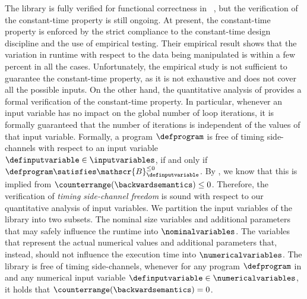 The library is fully verified for functional correctness in \hollight~, but the verification of the constant-time property is still ongoing.
At present, the constant-time property is enforced by the strict compliance to the constant-time design discipline and the use of empirical testing.
Their empirical
result
shows that the variation in runtime with respect to the data being manipulated is within a few percent in all the cases.
Unfortunately, the empirical study is not sufficient to guarantee the constant-time property, as it is not exhaustive and does not cover all the possible inputs.
On the other hand, the quantitative analysis of \timesec{} provides a formal verification of the constant-time property.
In particular, whenever an input variable has no impact on the global number of loop iterations, it is formally guaranteed that the number of iterations is independent of the values of that input variable.
Formally, a program $\defprogram$ is free of timing side-channels with respect to an input variable $\definputvariable\in\inputvariables$, if and only if $\defprogram \satisfies \mathscr{B}^{\le 0}_{\definputvariable}$.
By , we know that this is implied from $\counterrange(\backwardsemantics) \le 0$.
Therefore, the verification of \textit{timing side-channel freedom} is sound with respect to our quantitative analysis of input variables.
We partition the input variables of the \bignum{} library into two subsets.
The nominal size variables and additional parameters that may safely influence the runtime into $\nominalvariables$.
The variables that represent the actual numerical values and additional parameters that, instead, should not influence the execution time into $\numericalvariables$.
The \bignum{} library is free of timing side-channels, whenever for any program $\defprogram$ in \bignum{} and any numerical input variable $\definputvariable\in\numericalvariables$, it holds that $\counterrange(\backwardsemantics) = 0$.

